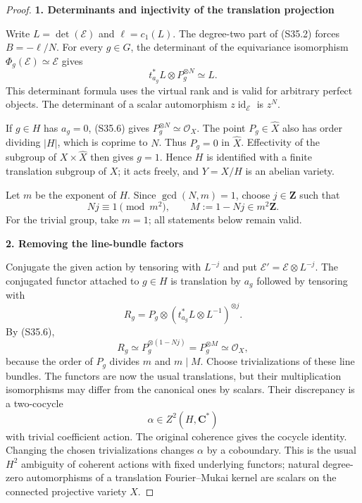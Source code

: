 \documentclass[11pt,a4paper]{article}
\theoremstyle{definition}
\begin{document}
\begin{proof}
\par\medskip\noindent\textbf{1. Determinants and injectivity of the translation projection}\quad

Write \(L=\det(\mathcal E)\) and \(\ell=c_1(L)\). The degree-two part of (S35.2) forces \(B=-\ell/N\). For every \(g\in G\), the determinant of the equivariance isomorphism \(\Phi_g(\mathcal E)\simeq\mathcal E\) gives \[
 t_{a_g}^*L\otimes P_g^{\otimes N}\simeq L.
 \tag{S35.6}
\] This determinant formula uses the virtual rank and is valid for arbitrary perfect objects. The determinant of a scalar automorphism \(z\operatorname{id}_{\mathcal E}\) is \(z^N\).

If \(g\in H\) has \(a_g=0\), (S35.6) gives \(P_g^{\otimes N}\simeq\mathcal O_X\). The point \(P_g\in\widehat X\) also has order dividing \(|H|\), which is coprime to \(N\). Thus \(P_g=0\) in \(\widehat X\). Effectivity of the subgroup of \(X\times\widehat X\) then gives \(g=1\). Hence \(H\) is identified with a finite translation subgroup of \(X\); it acts freely, and \(Y=X/H\) is an abelian variety.

Let \(m\) be the exponent of \(H\). Since \(\gcd(N,m)=1\), choose \(j\in\mathbf Z\) such that \[
 Nj\equiv1\pmod{m^2},\qquad M:=1-Nj\in m^2\mathbf Z.
 \tag{S35.7}
\] For the trivial group, take \(m=1\); all statements below remain valid.

\par\medskip\noindent\textbf{2. Removing the line-bundle factors}\quad

Conjugate the given action by tensoring with \(L^{-j}\) and put \(\mathcal E'=\mathcal E\otimes L^{-j}\). The conjugated functor attached to \(g\in H\) is translation by \(a_g\) followed by tensoring with \[
 R_g=P_g\otimes(t_{a_g}^*L\otimes L^{-1})^{\otimes j}.
\] By (S35.6), \[
 R_g\simeq P_g^{\otimes(1-Nj)}=P_g^{\otimes M}
                  \simeq\mathcal O_X,
 \tag{S35.8}
\] because the order of \(P_g\) divides \(m\) and \(m\mid M\). Choose trivializations of these line bundles. The functors are now the usual translations, but their multiplication isomorphisms may differ from the canonical ones by scalars. Their discrepancy is a two-cocycle \[
 \alpha\in Z^2(H,\mathbf C^*)
 \tag{S35.9}
\] with trivial coefficient action. The original coherence gives the cocycle identity. Changing the chosen trivializations changes \(\alpha\) by a coboundary. This is the usual \(H^2\) ambiguity of coherent actions with fixed underlying functors; natural degree-zero automorphisms of a translation Fourier--Mukai kernel are scalars on the connected projective variety \(X\).


\end{proof}
\end{document}

